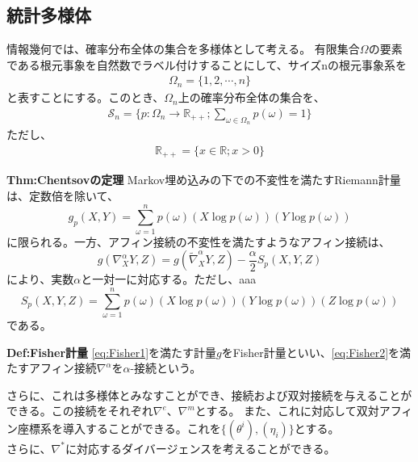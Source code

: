 \documentclass[a4paper,11pt]{jsarticle}
\numberwithin{equation}{section}
\begin{document}
\subsection{統計多様体}
情報幾何では、確率分布全体の集合を多様体として考える。
有限集合$\Omega$の要素である根元事象を自然数でラベル付けすることにして、サイズnの根元事象系を
\begin{align}
    \Omega_n = \{1,2,\cdots,n\}
\end{align}
と表すことにする。このとき、$\Omega_n$上の確率分布全体の集合を、
\begin{align}
    \mathcal{S}_n = \{p: \Omega_n \to \mathbb{R}_{++}; \sum_{\omega \in \Omega_n} p(\omega) = 1\}
\end{align}
ただし、
\begin{align}
    \mathbb{R}_{++} = \{x \in \mathbb{R}; x > 0\}
\end{align}



\begin{itembox}[l]{\textbf{Thm:Chentsovの定理}}
    Markov埋め込みの下での不変性を満たすRiemann計量は、定数倍を除いて、
    \begin{equation}
        \label{eq:Fisher1}
        g_p(X,Y) = \sum_{\omega = 1}^{n} p(\omega) (X\log p(\omega))(Y\log p(\omega))
    \end{equation}
    に限られる。一方、アフィン接続の不変性を満たすようなアフィン接続は、
    \begin{equation}    
        \label{eq:Fisher2}
        g(\nabla_X^{\alpha} Y,Z) = g(\tilde{\nabla}_X^{\alpha} Y,Z) - \frac{\alpha}{2} S_p(X,Y,Z)
    \end{equation}
    により、実数$\alpha$と一対一に対応する。ただし、aaa
    \begin{equation}
        S_p(X,Y,Z) = \sum_{\omega = 1}^{n} p(\omega) (X\log p(\omega))(Y\log p(\omega))(Z\log p(\omega))
    \end{equation}
    である。
\end{itembox}

\begin{itembox}[l]{\textbf{Def:Fisher計量}}
    \ref{eq:Fisher1}を満たす計量$g$をFisher計量といい、\ref{eq:Fisher2}を満たすアフィン接続$\nabla^{\alpha}$を$\alpha$-接続という。
\end{itembox}
さらに、これは多様体とみなすことができ、接続および双対接続を与えることができる。この接続をそれぞれ$\nabla^{e}$、$\nabla^{m}$とする。
また、これに対応して双対アフィン座標系を導入することができる。これを$\{(\theta^i),(\eta_i)\}$とする。\\
さらに、$\nabla^*$に対応するダイバージェンスを考えることができる。
\end{document}
